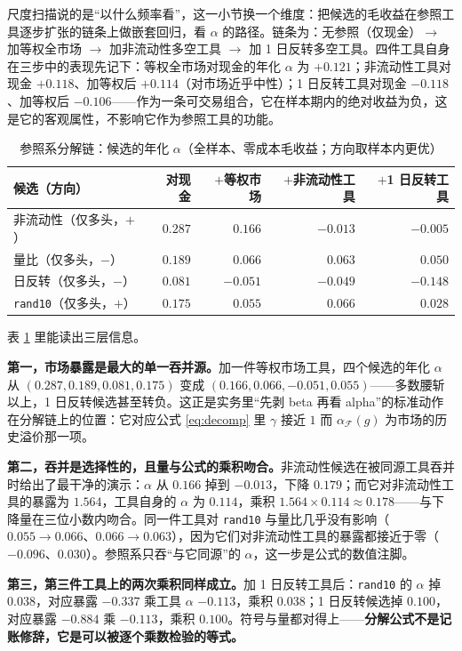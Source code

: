 尺度扫描说的是“以什么频率看”，这一小节换一个维度：把候选的毛收益在参照工具逐步扩张的链条上做嵌套回归，看 $\alpha$ 的路径。链条为：无参照（仅现金）$\to$ 加等权全市场 $\to$ 加非流动性多空工具 $\to$ 加 1 日反转多空工具。四件工具自身在三步中的表现先记下：等权全市场对现金的年化 $\alpha$ 为 $+0.121$；非流动性工具对现金 $+0.118$、加等权后 $+0.114$（对市场近乎中性）；1 日反转工具对现金 $-0.118$、加等权后 $-0.106$——作为一条可交易组合，它在样本期内的绝对收益为负，这是它的客观属性，不影响它作为参照工具的功能。

\begin{table}[htbp]
\centering
\caption{参照系分解链：候选的年化 $\alpha$（全样本、零成本毛收益；方向取样本内更优）}
\label{tab:decomp}
\begin{tabular}{@{}>{\raggedright\arraybackslash}p{3.4cm}r r r r@{}}
\toprule
候选（方向） & 对现金 & $+$等权市场 & $+$非流动性工具 & $+$1 日反转工具 \\
\midrule
非流动性（仅多头，$+$） & $0.287$ & $0.166$ & $-0.013$ & $-0.005$ \\
量比（仅多头，$-$） & $0.189$ & $0.066$ & $0.063$ & $0.050$ \\
1 日反转（仅多头，$-$） & $0.081$ & $-0.051$ & $-0.049$ & $-0.148$ \\
\texttt{rand10}（仅多头，$+$） & $0.175$ & $0.055$ & $0.066$ & $0.028$ \\
\bottomrule
\end{tabular}
\end{table}

表 \ref{tab:decomp} 里能读出三层信息。

\textbf{第一，市场暴露是最大的单一吞并源。}加一件等权市场工具，四个候选的年化 $\alpha$ 从 $(0.287,0.189,0.081,0.175)$ 变成 $(0.166,0.066,-0.051,0.055)$——多数腰斩以上，1 日反转候选甚至转负。这正是实务里“先剥 beta 再看 alpha”的标准动作在分解链上的位置：它对应公式 \eqref{eq:decomp} 里 $\gamma$ 接近 $1$ 而 $\alpha_{\mathcal{F}}(g)$ 为市场的历史溢价那一项。

\textbf{第二，吞并是选择性的，且量与公式的乘积吻合。}非流动性候选在被同源工具吞并时给出了最干净的演示：$\alpha$ 从 $0.166$ 掉到 $-0.013$，下降 $0.179$；而它对非流动性工具的暴露为 $1.564$，工具自身的 $\alpha$ 为 $0.114$，乘积 $1.564\times0.114\approx0.178$——与下降量在三位小数内吻合。同一件工具对 \texttt{rand10} 与量比几乎没有影响（$0.055\to0.066$、$0.066\to0.063$），因为它们对非流动性工具的暴露都接近于零（$-0.096$、$0.030$）。参照系只吞“与它同源”的 $\alpha$，这一步是公式的数值注脚。

\textbf{第三，第三件工具上的两次乘积同样成立。}加 1 日反转工具后：\texttt{rand10} 的 $\alpha$ 掉 $0.038$，对应暴露 $-0.337$ 乘工具 $\alpha$ $-0.113$，乘积 $0.038$；1 日反转候选掉 $0.100$，对应暴露 $-0.884$ 乘 $-0.113$，乘积 $0.100$。符号与量都对得上——\textbf{分解公式不是记账修辞，它是可以被逐个乘数检验的等式。}


